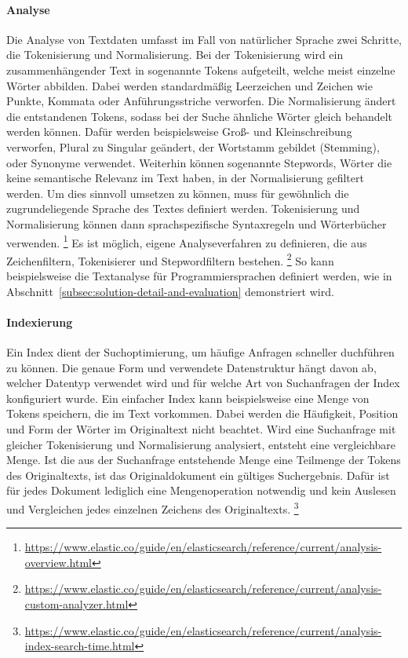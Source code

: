 \paragraph{Analyse}
Die Analyse von Textdaten umfasst im Fall von natürlicher Sprache zwei Schritte, die Tokenisierung und Normalisierung.
Bei der Tokenisierung wird ein zusammenhängender Text in sogenannte Tokens aufgeteilt, welche meist einzelne Wörter abbilden.
Dabei werden standardmäßig Leerzeichen und Zeichen wie Punkte, Kommata oder Anführungsstriche verworfen.
Die Normalisierung ändert die entstandenen Tokens, sodass bei der Suche ähnliche Wörter gleich behandelt werden können.
Dafür werden beispielsweise Groß- und Kleinschreibung verworfen, Plural zu Singular geändert, der Wortstamm gebildet (Stemming), oder Synonyme verwendet.
Weiterhin können sogenannte Stepwords, Wörter die keine semantische Relevanz im Text haben, in der Normalisierung gefiltert werden.
Um dies sinnvoll umsetzen zu können, muss für gewöhnlich die zugrundeliegende Sprache des Textes definiert werden.
Tokenisierung und Normalisierung können dann sprachspezifische Syntaxregeln und Wörterbücher verwenden.
\footnote{\url{https://www.elastic.co/guide/en/elasticsearch/reference/current/analysis-overview.html}}
Es ist möglich, eigene Analyseverfahren zu definieren, die aus Zeichenfiltern, Tokenisierer und Stepwordfiltern bestehen.
\footnote{\url{https://www.elastic.co/guide/en/elasticsearch/reference/current/analysis-custom-analyzer.html}}
So kann beispielsweise die Textanalyse für Programmiersprachen definiert werden, wie in Abschnitt~\ref{subsec:solution-detail-and-evaluation} demonstriert wird.

\paragraph{Indexierung}
Ein Index dient der Suchoptimierung, um häufige Anfragen schneller duchführen zu können.
Die genaue Form und verwendete Datenstruktur hängt davon ab, welcher Datentyp verwendet wird und für welche Art von Suchanfragen der Index konfiguriert wurde.
Ein einfacher Index kann beispielsweise eine Menge von Tokens speichern, die im Text vorkommen.
Dabei werden die Häufigkeit, Position und Form der Wörter im Originaltext nicht beachtet.
Wird eine Suchanfrage mit gleicher Tokenisierung und Normalisierung analysiert, entsteht eine vergleichbare Menge.
Ist die aus der Suchanfrage entstehende Menge eine Teilmenge der Tokens des Originaltexts, ist das Originaldokument ein gültiges Suchergebnis.
Dafür ist für jedes Dokument lediglich eine Mengenoperation notwendig und kein Auslesen und Vergleichen jedes einzelnen Zeichens des Originaltexts.
\footnote{\url{https://www.elastic.co/guide/en/elasticsearch/reference/current/analysis-index-search-time.html}}

